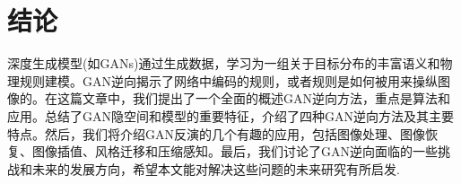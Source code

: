 \section{结论}
\label{sec:conclusion}
深度生成模型(如GANs)通过生成数据，学习为一组关于目标分布的丰富语义和物理规则建模。GAN逆向揭示了网络中编码的规则，或者规则是如何被用来操纵图像的。在这篇文章中，我们提出了一个全面的概述GAN逆向方法，重点是算法和应用。总结了GAN隐空间和模型的重要特征，介绍了四种GAN逆向方法及其主要特点。然后，我们将介绍GAN反演的几个有趣的应用，包括图像处理、图像恢复、图像插值、风格迁移和压缩感知。最后，我们讨论了GAN逆向面临的一些挑战和未来的发展方向，希望本文能对解决这些问题的未来研究有所启发.